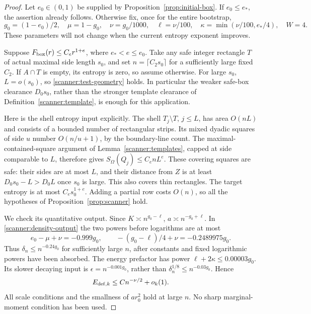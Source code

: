 \begin{proof}
Let \(e_0\in(0,1)\) be supplied by
Proposition~\ref{prop:initial-box}.  If \(e_0\le e_*\), the assertion
already follows.  Otherwise fix, once for the entire bootstrap,
\begin{equation}
 g_0=(1-e_0)/2,
 \quad \mu=1-g_0,
 \quad \nu=g_0/1000,
 \quad \ell=\nu/100,
 \quad \kappa=\min(\nu/100,e_*/4),
 \quad W=4.
 \label{scanner:bootstrap-parameters}
\end{equation}
These parameters will not change when the current entropy exponent
improves.

Suppose \(F_{\rm box}(r)\le C_e r^{1+e}\), where
\(e_*<e\le e_0\).  Take any safe integer rectangle \(T\) of actual
maximal side length \(s_0\), and set \(n=\lceil C_2s_0\rceil\)
for a sufficiently large fixed \(C_2\).  If \(A\cap T\) is empty,
its entropy is zero, so assume otherwise.  For large \(s_0\),
\(L=o(s_0)\), so \eqref{scanner:test-geometry} holds.  In particular
the weaker safe-box clearance \(D_0s_0\), rather than the stronger
template clearance of Definition~\ref{scanner:template}, is enough
for this application.

Here is the shell entropy input explicitly.  The shell
\(T_j\setminus T\), \(j\le L\), has area \(O(nL)\) and consists
of a bounded number of rectangular strips.  Its mixed dyadic squares
of side \(u\) number \(O(n/u+1)\), by the boundary-line count.
The maximal-contained-square argument of
Lemma~\ref{scanner:templates}, capped at side comparable to \(L\),
therefore gives \(S_\Omega(Q_j)\le C_e nL^e\).  These covering
squares are safe: their sides are at most \(L\), and their distance
from \(Z\) is at least \(D_0s_0-L>D_0L\) once \(s_0\) is large.
This also covers thin rectangles.  The target entropy is at most
\(C_e s_0^{1+e}\).  Adding a partial row costs \(O(n)\), so all
the hypotheses of Proposition~\ref{prop:scanner} hold.

We check its quantitative output.  Since
\(K\asymp n^{g_0-\ell}\),
\(a\asymp n^{-g_0+\ell}\).  In
\eqref{scanner:density-output} the two powers before logarithms are
at most
\[
 e_0-\mu+\nu=-0.999g_0,
 \qquad -(g_0-\ell)/4+\nu=-0.2489975g_0.
\]
Thus \(\delta_n\le n^{-0.24g_0}\) for sufficiently large \(n\),
after constants and fixed logarithmic powers have been absorbed.
The energy prefactor has power
\(\ell+2\kappa\le0.00003g_0\).  Its slower decaying input is
\(\epsilon=n^{-0.001g_0}\), rather than
\(\delta_n^{1/8}\le n^{-0.03g_0}\).  Hence
\begin{equation}
 E_{{\rm def},k}\le Cn^{-\nu/2}+o_k(1).
 \label{scanner:bootstrap-energy}
\end{equation}
All scale conditions and the smallness of \(ar_0^2\) hold at large
\(n\).  No sharp marginal-moment condition has been used.


\end{proof}
